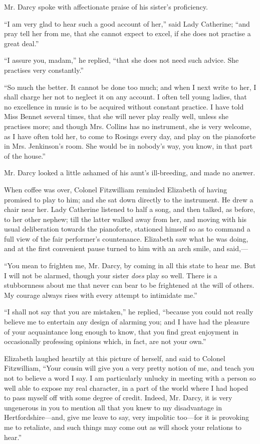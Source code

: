 Mr. Darcy spoke with affectionate praise of his sister's proficiency.

``I am very glad to hear such a good account of her,'' said Lady Catherine; ``and pray tell her from me, that she cannot expect to excel, if she does not practise a great deal.''

``I assure you, madam,'' he replied, ``that she does not need such advice. She practises very constantly.''

``So much the better. It cannot be done too much; and when I next write to her, I shall charge her not to neglect it on any account. I often tell young ladies, that no excellence in music is to be acquired without constant practice. I have told Miss Bennet several times, that she will never play really well, unless she practises more; and though Mrs. Collins has no instrument, she is very welcome, as I have often told her, to come to Rosings every day, and play on the pianoforte in Mrs. Jenkinson's room. She would be in nobody's way, you know, in that part of the house.''

Mr. Darcy looked a little ashamed of his aunt's ill-breeding, and made no answer.

When coffee was over, Colonel Fitzwilliam reminded Elizabeth of having promised to play to him; and she sat down directly to the instrument. He drew a chair near her. Lady Catherine listened to half a song, and then talked, as before, to her other nephew; till the latter walked away from her, and moving with his usual deliberation towards the pianoforte, stationed himself so as to command a full view of the fair performer's countenance. Elizabeth saw what he was doing, and at the first convenient pause turned to him with an arch smile, and said,---

``You mean to frighten me, Mr. Darcy, by coming in all this state to hear me. But I will not be alarmed, though your sister \textit{does} play so well. There is a stubbornness about me that never can bear to be frightened at the will of others. My courage always rises with every attempt to intimidate me.''

``I shall not say that you are mistaken,'' he replied, ``because you could not really believe me to entertain any design of alarming you; and I have had the pleasure of your acquaintance long enough to know, that you find great enjoyment in occasionally professing opinions which, in fact, are not your own.''

Elizabeth laughed heartily at this picture of herself, and said to Colonel Fitzwilliam, ``Your cousin will give you a very pretty notion of me, and teach you not to believe a word I say. I am particularly unlucky in meeting with a person so well able to expose my real character, in a part of the world where I had hoped to pass myself off with some degree of credit. Indeed, Mr. Darcy, it is very ungenerous in you to mention all that you knew to my disadvantage in Hertfordshire---and, give me leave to say, very impolitic too---for it is provoking me to retaliate, and such things may come out as will shock your relations to hear.''

